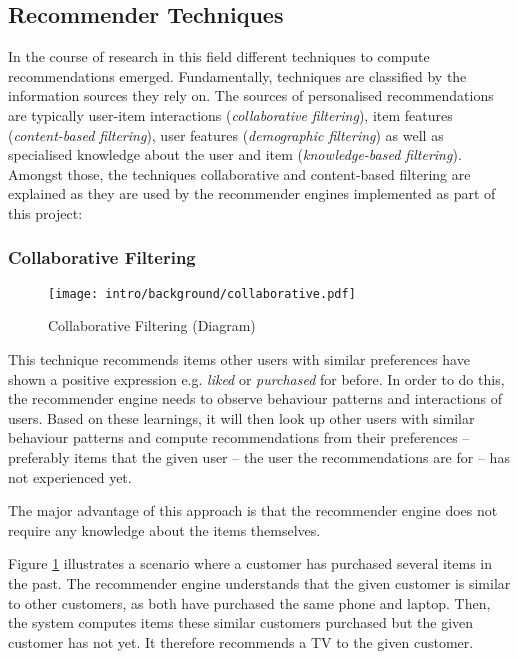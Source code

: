 \subsection{Recommender Techniques}
\label{intro-bg-tech}

In the course of research in this field different techniques to compute recommendations emerged. Fundamentally, techniques are classified by the information sources they rely on. The sources of personalised recommendations are typically user-item interactions (\emph{collaborative filtering}), item features (\emph{content-based filtering}), user features (\emph{demographic filtering}) as well as specialised knowledge about the user and item (\emph{knowledge-based filtering}).  Amongst those, the techniques collaborative and content-based filtering are explained as they are used by the recommender engines implemented as part of this project:

\subsubsection{Collaborative Filtering}
\label{intro-bg-tech-collaborative}

\begin{figure}[ht]
    \texttt{[image: intro/background/collaborative.pdf]}
    \caption{Collaborative Filtering (Diagram)}
    \label{fig:intro-techniques-collaborative}
\end{figure}

This technique recommends items other users with similar preferences have shown a positive expression e.g. \emph{liked} or \emph{purchased} for before. In order to do this, the recommender engine needs to observe behaviour patterns and interactions of users. Based on these learnings, it will then look up other users with similar behaviour patterns and compute recommendations from their preferences -- preferably items that the given user -- the user the recommendations are for -- has not experienced yet.

The major advantage of this approach is that the recommender engine does not require any knowledge about the items themselves.

Figure \ref{fig:intro-techniques-collaborative} illustrates a scenario where a customer has purchased several items in the past. The recommender engine understands that the given customer is similar to other customers, as both have purchased the same phone and laptop. Then, the system computes items these similar customers purchased but the given customer has not yet. It therefore recommends a TV to the given customer.

